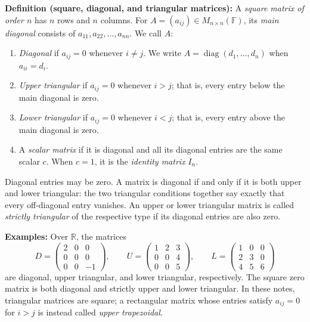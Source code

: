 \documentclass[a4paper,11pt,abstract=true]{scrartcl}
\theoremstyle{dotlessP}
\theoremstyle{dotlessS}
\theoremstyle{remark}
\theoremstyle{definition}
\begin{document}
\begin{claim_box}
\textbf{Definition (square, diagonal, and triangular matrices):}
A \emph{square matrix of order $n$} has $n$ rows and $n$ columns.
For $A=(a_{ij})\in M_{n\times n}(\mathbb{F})$, its \emph{main diagonal}
consists of $a_{11},a_{22},\ldots,a_{nn}$. We call $A$:
\begin{enumerate}
    \item \emph{Diagonal} if $a_{ij}=0$ whenever $i\neq j$.
    We write $A=\operatorname{diag}(d_1,\ldots,d_n)$ when $a_{ii}=d_i$.
    \item \emph{Upper triangular} if $a_{ij}=0$ whenever $i>j$;
    that is, every entry below the main diagonal is zero.
    \item \emph{Lower triangular} if $a_{ij}=0$ whenever $i<j$;
    that is, every entry above the main diagonal is zero.
    \item A \emph{scalar matrix} if it is diagonal and all its
    diagonal entries are the same scalar $c$. When $c=1$, it is the
    \emph{identity matrix} $I_n$.
\end{enumerate}
Diagonal entries may be zero. A matrix is diagonal if and only if it is
both upper and lower triangular: the two triangular conditions together
say exactly that every off-diagonal entry vanishes. An upper or lower
triangular matrix is called \emph{strictly triangular} of the respective
type if its diagonal entries are also zero.
\end{claim_box}

\begin{example_box}
\textbf{Examples:} Over $\mathbb{R}$, the matrices
\[
D=\begin{pmatrix}2&0&0\\0&0&0\\0&0&-1\end{pmatrix},\qquad
U=\begin{pmatrix}1&2&3\\0&0&4\\0&0&5\end{pmatrix},\qquad
L=\begin{pmatrix}1&0&0\\2&3&0\\4&5&6\end{pmatrix}
\]
are diagonal, upper triangular, and lower triangular, respectively.
The square zero matrix is both diagonal and strictly upper and lower
triangular. In these notes, triangular matrices are square; a rectangular
matrix whose entries satisfy $a_{ij}=0$ for $i>j$ is instead called
\emph{upper trapezoidal}.
\end{example_box}
\end{document}
